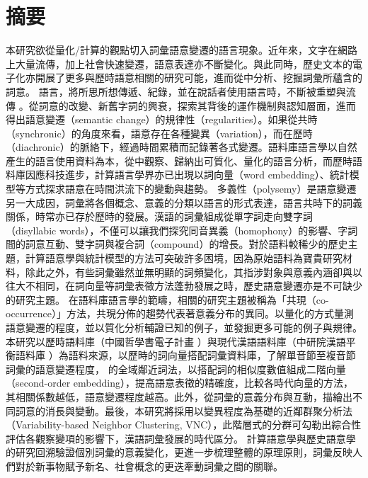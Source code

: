 

\chapter*{摘要}
本研究欲從量化/計算的觀點切入詞彙語意變遷的語言現象。近年來，文字在網路上大量流傳，加上社會快速變遷，語意表達亦不斷變化。與此同時，歷史文本的電子化亦開展了更多與歷時語意相關的研究可能，進而從中分析、挖掘詞彙所蘊含的詞意。 語言，將所思所想傳遞、紀錄，並在說話者使用語言時，不斷被重塑與流傳 \parencite[61]{blank1999new}。從詞意的改變、新舊字詞的興衰，探索其背後的運作機制與認知層面，進而得出語意變遷（semantic change）的規律性（regularities）\parencite[63]{blank1999new}。如果從共時（synchronic）的角度來看，語意存在各種變異（variation），而在歷時（diachronic）的脈絡下，經過時間累積而記錄著各式變遷。語料庫語言學以自然產生的語言使用資料為本，從中觀察、歸納出可質化、量化的語言分析，而歷時語料庫因應科技進步，計算語言學界亦已出現以詞向量（word embedding）、統計模型等方式探求語意在時間洪流下的變動與趨勢。 多義性（polysemy）是語意變遷另一大成因，詞彙將各個概念、意義的分類以語言的形式表達，語言共時下的詞義關係，時常亦已存於歷時的發展。漢語的詞彙組成從單字詞走向雙字詞（disyllabic words），不僅可以讓我們探究同音異義（homophony）的影響、字詞間的詞意互動、雙字詞與複合詞（compound）的增長。對於語料較稀少的歷史主題，計算語意學與統計模型的方法可突破許多困境，因為原始語料為寶貴研究材料，除此之外，有些詞彙雖然並無明顯的詞頻變化，其指涉對象與意義內涵卻與以往大不相同，在詞向量等詞彙表徵方法蓬勃發展之時，歷史語意變遷亦是不可缺少的研究主題。 在語料庫語言學的範疇，相關的研究主題被稱為「共現（co-occurrence）」方法，共現分佈的趨勢代表著意義分布的異同。以量化的方式量測語意變遷的程度，並以質化分析輔證已知的例子，並發掘更多可能的例子與規律。本研究以歷時語料庫（中國哲學書電子計畫 \parencite{sturgeon2019ctext}）與現代漢語語料庫（中研院漢語平衡語料庫 \parencite{chen1996sinica}）為語料來源，以歷時的詞向量搭配詞彙資料庫，了解單音節至複音節詞彙的語意變遷程度，\textcite{hamilton2016cultural} 的全域鄰近詞法，以搭配詞的相似度數值組成二階向量（second-order embedding），提高語意表徵的精確度，比較各時代向量的方法，其相關係數越低，語意變遷程度越高。此外，從詞彙的意義分布與互動，描繪出不同詞意的消長與變動。最後，本研究將採用以變異程度為基礎的近鄰群聚分析法（Variability-based Neighbor Clustering, VNC）\parencite{gries2012variability}，此階層式的分群可勾勒出綜合性評估各觀察變項的影響下，漢語詞彙發展的時代區分。 計算語意學與歷史語意學的研究回溯驗證個別詞彙的意義變化，更進一步梳理整體的原理原則，詞彙反映人們對於新事物賦予新名、社會概念的更迭牽動詞彙之間的關聯。


